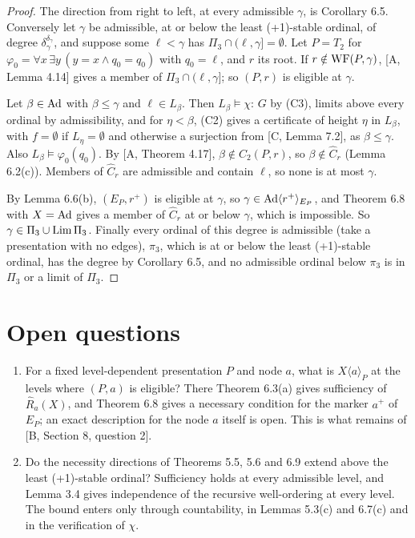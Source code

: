 \documentclass[11pt]{article}
\begin{document}
\begin{proof}
The direction from right to left, at every admissible $\gamma$, is Corollary 6.5. Conversely let $\gamma$ be
admissible, at or below the least (+1)-stable ordinal, of degree $\delta_\gamma^{\delta_\gamma}$, and suppose some $\ell < \gamma$ has $\Pi_3 \cap (\ell, \gamma] =
\emptyset$. Let $P = T_2$ for $\varphi_0 = \forall x\, \exists y\, (y = x \wedge q_0 = q_0)$ with $q_0 = \ell$, and $r$
its root. If $r \notin \mathrm{WF}(P,\gamma)$, [A, Lemma 4.14] gives a member of $\Pi_3 \cap (\ell, \gamma]$; so $(P,r)$ is
eligible at $\gamma$.

Let $\beta \in \mathrm{Ad}$ with $\beta \le \gamma$ and $\ell \in L_\beta$. Then $L_\beta \models \chi$: $G$ by (C3), limits
above every ordinal by admissibility, and for $\eta < \beta$, (C2) gives a certificate of height $\eta$ in $L_\beta$,
with $f = \emptyset$ if $L_\eta = \emptyset$ and otherwise a surjection from [C, Lemma 7.2], as $\beta \le \gamma$. Also
$L_\beta \models \varphi_0(q_0)$. By [A, Theorem 4.17], $\beta \notin C_2(P,r)$, so $\beta \notin \widehat C_r$ (Lemma
6.2(c)). Members of $\widehat C_r$ are admissible and contain $\ell$, so none is at most $\gamma$.

By Lemma 6.6(b), $(E_P, r^+)$ is eligible at $\gamma$, so $\gamma \in \mathrm{Ad}\langle r^+\rangle_{E_P}$, and Theorem 6.8 with
$X = \mathrm{Ad}$ gives a member of $\widehat C_r$ at or below $\gamma$, which is impossible. So $\gamma \in \Pi_3 \cup \mathrm{Lim}\, \Pi_3$.
Finally every ordinal of this degree is admissible (take a presentation with no edges), $\pi_3$, which is at or below the least (+1)-stable ordinal, has the degree
by Corollary 6.5, and no admissible ordinal below $\pi_3$ is in $\Pi_3$ or a limit of $\Pi_3$.
\end{proof}

\section{Open questions}

\begin{enumerate}
\item For a fixed level-dependent presentation $P$ and node $a$, what is $X\langle a\rangle_P$ at the levels where
  $(P,a)$ is eligible? There Theorem 6.3(a) gives sufficiency of $\widehat R_a(X)$, and Theorem 6.8 gives a necessary
  condition for the marker $a^+$ of $E_P$; an exact description for the node $a$ itself is open. This is what remains
  of [B, Section 8, question 2].
\item Do the necessity directions of Theorems 5.5, 5.6 and 6.9 extend above the least (+1)-stable ordinal? Sufficiency holds at every
  admissible level, and Lemma 3.4 gives independence of the recursive well-ordering at every level. The bound enters
  only through countability, in Lemmas 5.3(c) and 6.7(c) and in the verification of $\chi$.
\end{enumerate}
\end{document}
